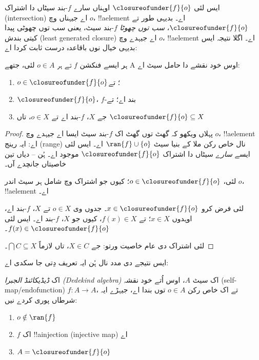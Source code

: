 \documentclass[../../../include/open-logic-section]{subfiles}
\begin{document}
ایس لئی $\closureofunder{f}{o}$ اوہناں سارے $f$-بند سیٹاں دا اشتراک
(intersection) اے جیہناں وچ $o$، !!a{element} اے۔ بدیہی طور تے
$\closureofunder{f}{o}$، \emph{سب توں چھوٹا} $f$-بند سیٹ، یعنی سب توں
چھوٹی پیدا کیتی بندش (least generated closure) اے جیہدے وچ $o$،
!!a{element} اے۔ اگلا نتیجہ ایس بدیہی خیال نوں باقاعدہ درست ثابت کردا اے:
\begin{lem}
	ہر ایسے فنکشن $f$ تے ہر $o \in A$ لئی، جتھے A اوس خود نقشے دا حامل سیٹ اے:
	\begin{enumerate}
		\item{} $o \in \closureofunder{f}{o}$؛ تے
		\item{} $\closureofunder{f}{o}$، $f$-بند اے؛ تے
		\item{} جے $X$، $f$-بند اے تے $o \in
		X$، تاں $\closureofunder{f}{o} \subseteq X$
	\end{enumerate}
\end{lem}

\begin{proof}
پہلاں ویکھو کہ گھٹ توں گھٹ اک $f$-بند سیٹ ایسا اے جیہدے وچ $o$،
!!a{element} اے: ایہ رینج (range) نال خاص رکن ملا کے بنیا سیٹ
$\ran{f}\cup \{o\}$ اے۔ ایس لئی ایسے \emph{سارے} سیٹاں دا اشتراک
$\closureofunder{f}{o}$ موجود اے۔ ہُن --
دیاں تین خاصیتاں جانچدے آں۔

 لئی، $o \in \closureofunder{f}{o}$؛ کیوں جو
اشتراک وچ شامل ہر سیٹ اندر $o$، !!a{element} اے۔

 لئی فرض کرو $x \in \closureofunder{f}{o}$۔
جدوں وی $o \in X$ تے $X$، $f$-بند اے، اوہدوں $x \in X$؛ تے
$f(x) \in X$، کیوں جو $X$، $f$-بند اے۔ ایس لئی
$f(x) \in \closureofunder{f}{o}$۔

 لئی اشتراک دی عام خاصیت ورتو: جے $X
\in C$، تاں لازماً $\bigcap C \subseteq X$۔
\end{proof}

ایس نتیجے دی مدد نال ہُن ایہ تعریف دِتی جا سکدی اے:

\begin{defn}
اک \emph{ڈیڈیکائنڈ الجبرا (Dedekind algebra)} اک سیٹ $A$، اوس اُتے
خود نقشہ (self-map/endofunction) $f \colon A \to A$، تے اک خاص رکن
$o \in A$ توں بندا اے، جیہڑے ایہ شرطاں پوری کردے نیں:
	\begin{enumerate}
		\item {} $o \notin \ran{f}$
		\item {} $f$ اک !!a{injection} (injective map) اے
		\item {} $A = \closureofunder{f}{o}$
	\end{enumerate}
\end{defn}
\end{document}
